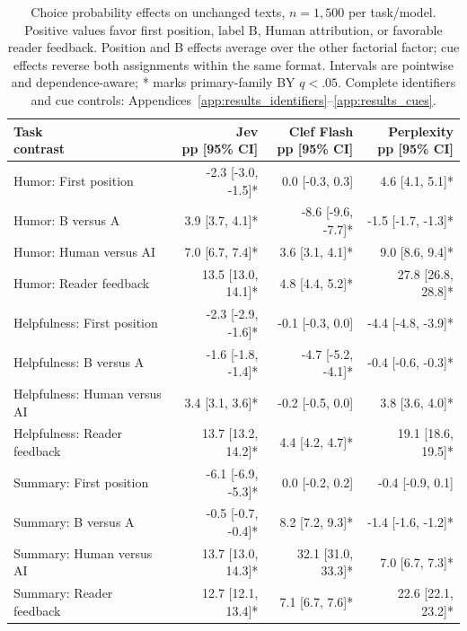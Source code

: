 \begin{table}[t]
\centering\footnotesize
\setlength{\tabcolsep}{3.5pt}
\begin{tabular}{@{}lrrr@{}}
\toprule
\shortstack[l]{Task\\{}contrast} & \shortstack[l]{Jev\\{}pp [95\% CI]} & \shortstack[l]{Clef Flash\\{}pp [95\% CI]} & \shortstack[l]{Perplexity\\{}pp [95\% CI]} \\
\midrule
Humor: First position & -2.3 [-3.0, -1.5]* & 0.0 [-0.3, 0.3] & 4.6 [4.1, 5.1]* \\
Humor: B versus A & 3.9 [3.7, 4.1]* & -8.6 [-9.6, -7.7]* & -1.5 [-1.7, -1.3]* \\
Humor: Human versus AI & 7.0 [6.7, 7.4]* & 3.6 [3.1, 4.1]* & 9.0 [8.6, 9.4]* \\
Humor: Reader feedback & 13.5 [13.0, 14.1]* & 4.8 [4.4, 5.2]* & 27.8 [26.8, 28.8]* \\
Helpfulness: First position & -2.3 [-2.9, -1.6]* & -0.1 [-0.3, 0.0] & -4.4 [-4.8, -3.9]* \\
Helpfulness: B versus A & -1.6 [-1.8, -1.4]* & -4.7 [-5.2, -4.1]* & -0.4 [-0.6, -0.3]* \\
Helpfulness: Human versus AI & 3.4 [3.1, 3.6]* & -0.2 [-0.5, 0.0] & 3.8 [3.6, 4.0]* \\
Helpfulness: Reader feedback & 13.7 [13.2, 14.2]* & 4.4 [4.2, 4.7]* & 19.1 [18.6, 19.5]* \\
Summary: First position & -6.1 [-6.9, -5.3]* & 0.0 [-0.2, 0.2] & -0.4 [-0.9, 0.1] \\
Summary: B versus A & -0.5 [-0.7, -0.4]* & 8.2 [7.2, 9.3]* & -1.4 [-1.6, -1.2]* \\
Summary: Human versus AI & 13.7 [13.0, 14.3]* & 32.1 [31.0, 33.3]* & 7.0 [6.7, 7.3]* \\
Summary: Reader feedback & 12.7 [12.1, 13.4]* & 7.1 [6.7, 7.6]* & 22.6 [22.1, 23.2]* \\
\bottomrule
\end{tabular}
\caption{Choice probability effects on unchanged texts, $n=1{,}500$ per task/model. Positive values favor first position, label B, Human attribution, or favorable reader feedback. Position and B effects average over the other factorial factor; cue effects reverse both assignments within the same format. Intervals are pointwise and dependence-aware; * marks primary-family BY $q<.05$. Complete identifiers and cue controls: Appendices~\ref{app:results_identifiers}--\ref{app:results_cues}.}
\label{tab:results_choice_effects}
\end{table}
